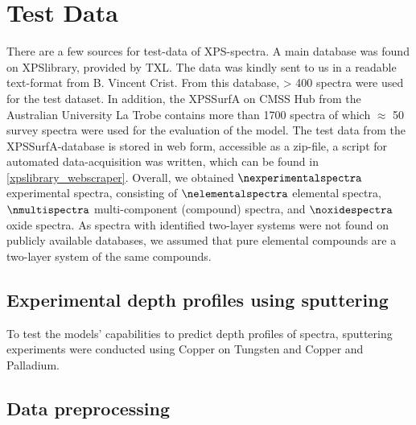 
\label{test_data}
\section{Test Data}

There are a few sources for test-data of XPS-spectra. A main database was found on XPSlibrary, provided by TXL. The data was kindly sent to us in a readable text-format from B. Vincent Crist. From this database, > 400 spectra were used for the test dataset. In addition, the XPSSurfA on CMSS Hub from the Australian University La Trobe contains more than 1700 spectra of which $\approx$ 50 survey spectra were used for the evaluation of the model. The test data from the XPSSurfA-database is stored in web form, accessible as a zip-file, a script for automated data-acquisition was written, which can be found in \ref{xpslibrary_webscraper}.
Overall, we obtained $\nexperimentalspectra$ experimental spectra, consisting of $\nelementalspectra$ elemental spectra, $\nmultispectra$  multi-component (compound) spectra, and $\noxidespectra$ oxide spectra.
As spectra with identified two-layer systems were not found on publicly available databases, we assumed that pure elemental compounds are a two-layer system of the same compounds.

\subsection{Experimental depth profiles using sputtering}
To test the models' capabilities to predict depth profiles of spectra, sputtering experiments were conducted using Copper on Tungsten and Copper and Palladium.


\subsection{Data preprocessing}

